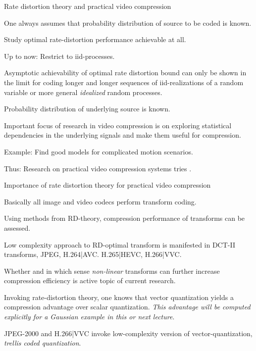 \begin{frame}{Rate distortion theory and practical video compression} 
\bit
\item One always assumes that probability distribution of source to be coded is known. 
\item Study optimal rate-distortion performance achievable at all.
\item Up to now: Restrict to iid-processes.
\item Asymptotic achievability of optimal rate distortion bound can only be 
shown in the limit for coding longer and longer sequences of iid-realizations of a random variable or more general
\textit{idealized} random processes. 
\eit

\bit
\item Probability distribution of underlying source is  known. 
\item Important focus of research in video compression is on exploring statistical dependencies in the underlying signals and make them useful for compression.
\item Example: Find good models for complicated motion scenarios. 
\item Thus:  Research on practical video compression systems tries .
\eit 
\end{frame}

\begin{frame}{Importance of rate distortion theory for practical video compression}

\bit
\item Basically all image and video codecs perform transform coding. 
\item Using methods from RD-theory, compression performance of transforms 
can be assessed. 
\item Low complexity approach to RD-optimal transform is manifested in DCT-II transforms, JPEG, H.264|AVC. H.265|HEVC, H.266|VVC. 
\item Whether and in which sense \textit{non-linear} transforms can further increase compression efficiency is active topic of current research.
\eit
{}
\bit
\item Invoking rate-distortion theory, one knows that vector quantization yields a compression advantage over scalar quantization. \textit{This advantage will 
be computed explicitly for a Gaussian example in this or next lecture}. 
\item JPEG-2000 and H.266|VVC invoke low-complexity version of vector-quantization, \textit{trellis coded quantization}. 
\eit 
\end{frame}

